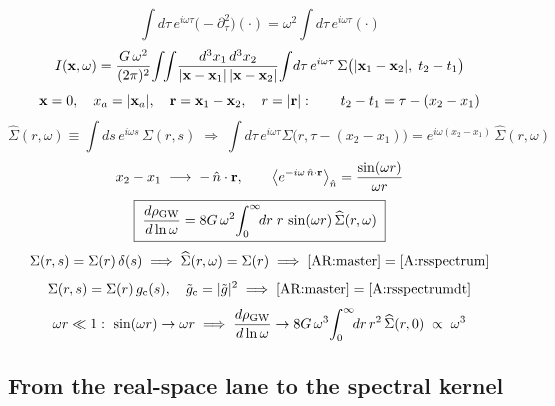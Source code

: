 \documentclass[10pt,prd,aps,nobibnotes,superscriptaddress,preprintnumbers,notitlepage]{revtex4-1}
\def \pa{\partial}
\newcommand{\n}{\hat{n}}
\newcommand{\xb}{{\bf x}}
\newcommand{\br}{{\bf r}}
\begin{document}
\begin{equation}
  \int\!d\tau\,e^{i\omega\tau}\bigl(-\pa_\tau^2\bigr)(\cdot)=\omega^2\!\int\!d\tau\,e^{i\omega\tau}(\cdot)
  \label{AR:byparts}
\end{equation}
\begin{equation}
  I(\xb,\omega)=\frac{G\,\omega^2}{(2\pi)^2}\!\int\!\!\int\!
  \frac{d^3x_1\,d^3x_2}{|\xb-\xb_1|\,|\xb-\xb_2|}
  \!\int\!d\tau\,e^{i\omega\tau}\,
  \Sigma\bigl(|\xb_1-\xb_2|,\;t_2-t_1\bigr)
  \label{AR:Iw}
\end{equation}
\begin{equation}
  \xb=0,\quad x_a=|\xb_a|,\quad \br=\xb_1-\xb_2,\quad r=|\br|:
  \qquad
  t_2-t_1=\tau-(x_2-x_1)
  \label{AR:shells}
\end{equation}
\begin{equation}
  \widehat\Sigma(r,\omega)\equiv\!\int\!ds\,e^{i\omega s}\,\Sigma(r,s)
  \;\Longrightarrow\;
  \int\!d\tau\,e^{i\omega\tau}\Sigma\bigl(r,\tau-(x_2-x_1)\bigr)
  =e^{i\omega(x_2-x_1)}\,\widehat\Sigma(r,\omega)
  \label{AR:temporal}
\end{equation}
\begin{equation}
  x_2-x_1\;\longrightarrow\;-\,\n\cdot\br,
  \qquad
  \bigl\langle e^{-i\omega\,\n\cdot\br}\bigr\rangle_{\n}
  =\frac{\sin(\omega r)}{\omega r}
  \label{AR:angular}
\end{equation}
\begin{equation}
  \boxed{\;
  \frac{d\rho_{\rm GW}}{d\ln\omega}
  =8G\,\omega^2\!\int_0^{\infty}\!\!dr\;r\,\sin(\omega r)\,\widehat\Sigma(r,\omega)\;}
  \label{AR:master}
\end{equation}
\begin{equation}
  \Sigma(r,s)=\Sigma(r)\,\delta(s)
  \;\Longrightarrow\;
  \widehat\Sigma(r,\omega)=\Sigma(r)
  \;\Longrightarrow\;
  \eqref{AR:master}=\eqref{A:rsspectrum}
  \label{AR:impulsive}
\end{equation}
\begin{equation}
  \Sigma(r,s)=\Sigma(r)\,g_{\rm c}(s),\quad \tilde g_{\rm c}=|\tilde g|^2
  \;\Longrightarrow\;
  \eqref{AR:master}=\eqref{A:rsspectrumdt}
  \label{AR:burst}
\end{equation}
\begin{equation}
  \omega r\ll1:\ \sin(\omega r)\to\omega r
  \;\Longrightarrow\;
  \frac{d\rho_{\rm GW}}{d\ln\omega}\to
  8G\,\omega^3\!\int_0^{\infty}\!\!dr\,r^2\,\widehat\Sigma(r,0)
  \;\propto\;\omega^3
  \label{AR:IR}
\end{equation}

\subsection{From the real-space lane to the spectral kernel}
\label{sec:chain-bridge}
\end{document}
